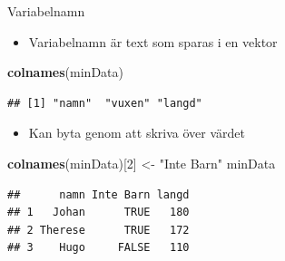 \documentclass[
  11pt,
  ignorenonframetext,
]{beamer}
\newenvironment{Shaded}{\begin{snugshade}}{\end{snugshade}}
\newcommand{\DecValTok}[1]{\textcolor[rgb]{0.00,0.00,0.81}{#1}}
\newcommand{\KeywordTok}[1]{\textcolor[rgb]{0.13,0.29,0.53}{\textbf{#1}}}
\newcommand{\NormalTok}[1]{#1}
\newcommand{\StringTok}[1]{\textcolor[rgb]{0.31,0.60,0.02}{#1}}
\providecommand{\tightlist}{%
  \setlength{\itemsep}{0pt}\setlength{\parskip}{0pt}}
\begin{document}
\begin{frame}[fragile]{Variabelnamn}
\protect\hypertarget{variabelnamn}{}
\begin{itemize}
\tightlist
\item
  Variabelnamn är text som sparas i en vektor
\end{itemize}

\begin{Shaded}
\begin{Highlighting}[]
\KeywordTok{colnames}\NormalTok{(minData)}
\end{Highlighting}
\end{Shaded}

\begin{verbatim}
## [1] "namn"  "vuxen" "langd"
\end{verbatim}

\pause

\begin{itemize}
\tightlist
\item
  Kan byta genom att skriva över värdet
\end{itemize}

\begin{Shaded}
\begin{Highlighting}[]
\KeywordTok{colnames}\NormalTok{(minData)[}\DecValTok{2}\NormalTok{] \textless{}{-}}\StringTok{ "Inte Barn"}
\NormalTok{minData}
\end{Highlighting}
\end{Shaded}

\begin{verbatim}
##      namn Inte Barn langd
## 1   Johan      TRUE   180
## 2 Therese      TRUE   172
## 3    Hugo     FALSE   110
\end{verbatim}
\end{frame}
\end{document}
